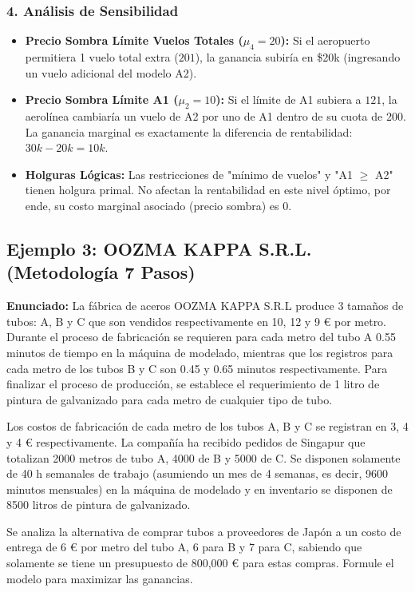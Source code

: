 \documentclass{article}
\begin{document}
	\subsubsection*{4. Análisis de Sensibilidad}
	\begin{itemize}
		\item \textbf{Precio Sombra Límite Vuelos Totales ($\mu_4 = 20$):} Si el aeropuerto permitiera 1 vuelo total extra ($201$), la ganancia subiría en \$20k (ingresando un vuelo adicional del modelo A2).
		\item \textbf{Precio Sombra Límite A1 ($\mu_2 = 10$):} Si el límite de A1 subiera a $121$, la aerolínea cambiaría un vuelo de A2 por uno de A1 dentro de su cuota de 200. La ganancia marginal es exactamente la diferencia de rentabilidad: $30k - 20k = 10k$.
		\item \textbf{Holguras Lógicas:} Las restricciones de "mínimo de vuelos" y "A1 $\geq$ A2" tienen holgura primal. No afectan la rentabilidad en este nivel óptimo, por ende, su costo marginal asociado (precio sombra) es 0.
	\end{itemize}
	
	\newpage

	\subsection{Ejemplo 3: OOZMA KAPPA S.R.L. (Metodología 7 Pasos)}
	
	\textbf{Enunciado:} La fábrica de aceros OOZMA KAPPA S.R.L produce 3 tamaños de tubos: A, B y C que son vendidos respectivamente en 10, 12 y 9 € por metro. Durante el proceso de fabricación se requieren para cada metro del tubo A 0.55 minutos de tiempo en la máquina de modelado, mientras que los registros para cada metro de los tubos B y C son 0.45 y 0.65 minutos respectivamente. Para finalizar el proceso de producción, se establece el requerimiento de 1 litro de pintura de galvanizado para cada metro de cualquier tipo de tubo. 
	
	Los costos de fabricación de cada metro de los tubos A, B y C se registran en 3, 4 y 4 € respectivamente. La compañía ha recibido pedidos de Singapur que totalizan 2000 metros de tubo A, 4000 de B y 5000 de C. Se disponen solamente de 40 h semanales de trabajo (asumiendo un mes de 4 semanas, es decir, 9600 minutos mensuales) en la máquina de modelado y en inventario se disponen de 8500 litros de pintura de galvanizado. 
	
	Se analiza la alternativa de comprar tubos a proveedores de Japón a un costo de entrega de 6 € por metro del tubo A, 6 para B y 7 para C, sabiendo que solamente se tiene un presupuesto de 800,000 € para estas compras. Formule el modelo para maximizar las ganancias.
	
\end{document}
